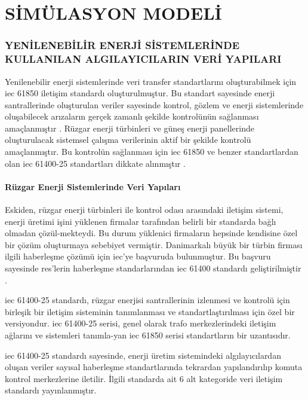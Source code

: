 \part{SİMÜLASYON MODELİ}
\thispagestyle{empty}
\newpage
\section{YENİLENEBİLİR ENERJİ SİSTEMLERİNDE KULLANILAN ALGILAYICILARIN VERİ YAPILARI}

Yenilenebilir enerji sistemlerinde veri transfer standartlarını oluşturabilmek için \gls{iec} 61850 iletişim standardı oluşturulmuştur. Bu standart sayesinde enerji santrallerinde oluşturulan veriler sayesinde kontrol, gözlem ve enerji sistemlerinde oluşabilecek arızaların gerçek zamanlı şekilde kontrolünün sağlanması amaçlanmıştır \cite{1385190}. Rüzgar enerji türbinleri ve güneş enerji panellerinde oluşturulacak sistemsel çalışma verilerinin aktif bir şekilde kontrolü amaçlanmıştır. Bu kontrolün sağlanması için \gls{iec} 61850 ve benzer standartlardan olan \gls{iec} 61400-25 standartları dikkate alınmıştır \cite{Olsen_prototypeof} \cite{francisco2016protection}.


\subsection{Rüzgar Enerji Sistemlerinde Veri Yapıları}
Eskiden, rüzgar enerji türbinleri ile kontrol odası arasındaki iletişim sistemi, enerji üretimi işini yüklenen firmalar tarafından belirli bir standarda bağlı olmadan çözül-mekteydi. Bu durum yüklenici firmaların hepsinde kendisine özel bir çözüm oluşturmaya sebebiyet vermiştir. Danimarkalı büyük bir türbin firması ilgili haberleşme çözümü için \gls{iec}'ye başvuruda bulunmuştur. Bu başvuru sayesinde \gls{res}'lerin haberleşme standarlarından \gls{iec} 61400 standardı geliştirilmiştir \cite{Olsen_prototypeof}.

\gls{iec} 61400-25 standardı, rüzgar enerjisi santrallerinin izlenmesi ve kontrolü için birleşik bir iletişim sisteminin tanımlanması ve standartlaştırılması için özel bir versiyondur. \gls{iec} 61400-25 serisi, genel olarak trafo merkezlerindeki iletişim ağlarını ve sistemleri tanımla-yan \gls{iec} 61850 serisi standartların bir uzantısıdır. 


\gls{iec} 61400-25 standardı sayesinde, enerji üretim sistemindeki algılayıcılardan oluşan veriler sayısal haberleşme standartlarında tekrardan yapılandırılıp komuta kontrol merkezlerine iletilir. İlgili standarda ait 6 alt kategoride veri iletişim standardı yayınlanmıştır.

